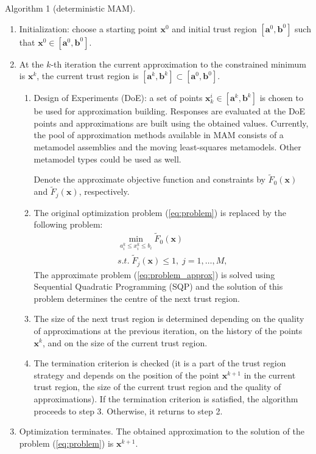 \documentclass[10pt,twocolumn,a4paper]{article}
\begin{document}
Algorithm 1 (deterministic MAM).
\begin{enumerate}
\item Initialization: choose a starting point $\pmb x^0$ and initial trust region $[\pmb a^0, \pmb b^0]$ such that $\pmb x^0 \in [\pmb a^0, \pmb b^0]$.
\item At the $k$-th iteration the current approximation to the constrained minimum is $\pmb x^k$, the current trust region is $[\pmb a^k, \pmb b^k] \subset [\pmb a^0, \pmb b^0]$.
  \begin{enumerate}[label=(\alph*)]
    \item Design of Experiments (DoE): a set of points $\pmb x_k^i \in [\pmb a^k, \pmb b^k]$ is chosen to be used for approximation building. Responses are evaluated at the DoE points and approximations are built using the obtained values. Currently, the pool of approximation methods available in MAM consists of a metamodel assemblies\cite{PolynkinToropov2012} and the moving least-squares metamodels\cite{LancasterSalkauskas1981,Liszka1984,ChoiYounYang2001,ToropovSchrammSahaiJones2005}. Other metamodel types could be used as well.

    Denote the approximate objective function and constraints by $\widetilde{F}_0(\pmb x)$ and $\widetilde{F}_j(\pmb x)$, respectively.
    \item The original optimization problem (\ref{eq:problem}) is replaced by the following problem:
    \begin{equation}
      \label{eq:problem_approx}
      \begin{array}{c}
      \min\limits_{a_i^k \le x_i ^k\le b_i}\widetilde{F}_0(\pmb x) \\
      s.t.\; \widetilde{F}_j(\pmb x) \le 1,\; j=1,\dots ,M,
      \end{array}
    \end{equation}
    The approximate problem (\ref{eq:problem_approx}) is solved using Sequential Quadratic Programming (SQP) and the solution of this problem   determines the centre of the next trust region.
    \item The size of the next trust region is determined depending on the quality of approximations at the previous iteration, on the history of the points $\pmb x^k$, and on the size of the current trust region\cite{KeulenToropovMarkine1996}.
    \item The termination criterion is checked (it is a part of the trust region strategy and depends on the position of the point $\pmb x^{k+1}$ in the current trust region, the size of the current trust region and the quality of approximations). If the termination criterion is satisfied, the algorithm proceeds to step 3. Otherwise, it returns to step 2.
  \end{enumerate}
  \item Optimization terminates. The obtained approximation to the solution of the problem (\ref{eq:problem}) is $\pmb x^{k+1}$.
\end{enumerate}
\end{document}
